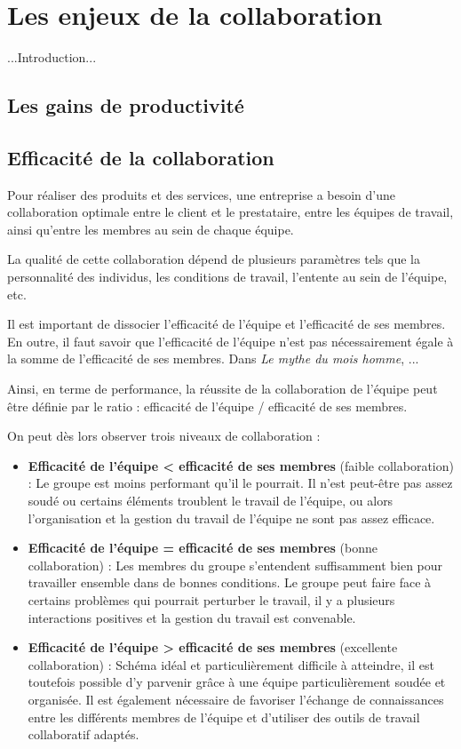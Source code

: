 \chapter{Les enjeux de la collaboration}

...Introduction...

\section{Les gains de productivité}


\section{Efficacité de la collaboration}

Pour réaliser des produits et des services, une entreprise a besoin d'une collaboration optimale entre le client et le prestataire, entre les équipes de travail, ainsi qu'entre les membres au sein de chaque équipe.

La qualité de cette collaboration dépend de plusieurs paramètres tels que la personnalité des individus, les conditions de travail, l'entente au sein de l'équipe, etc.

Il est important de dissocier l'efficacité de l'équipe et l'efficacité de ses membres. En outre, il faut savoir que l'efficacité de l'équipe n'est pas nécessairement égale à la somme de l'efficacité de ses membres. Dans \textit{Le mythe du mois homme}, ...

Ainsi, en terme de performance, la réussite de la collaboration de l'équipe peut être définie par le ratio : efficacité de l'équipe / efficacité de ses membres.

On peut dès lors observer trois niveaux de collaboration :

\begin{itemize}

\item \textbf{Efficacité de l'équipe \textless \: efficacité de ses membres} (faible collaboration) :
Le groupe est moins performant qu'il le pourrait. Il n'est peut-être pas assez soudé ou certains éléments troublent le travail de l'équipe, ou alors l'organisation et la gestion du travail de l'équipe ne sont pas assez efficace.

\item \textbf{Efficacité de l'équipe = efficacité de ses membres} (bonne collaboration) :
Les membres du groupe s'entendent suffisamment bien pour travailler ensemble dans de bonnes conditions. Le groupe peut faire face à certains problèmes qui pourrait perturber le travail, il y a plusieurs interactions positives et la gestion du travail est convenable.

\item \textbf{Efficacité de l'équipe \textgreater \: efficacité de ses membres} (excellente collaboration) :
Schéma idéal et particulièrement difficile à atteindre, il est toutefois possible d'y parvenir grâce à une équipe particulièrement soudée et organisée. Il est également nécessaire de favoriser l'échange de connaissances entre les différents membres de l'équipe et d'utiliser des outils de travail collaboratif adaptés.

\end{itemize}

